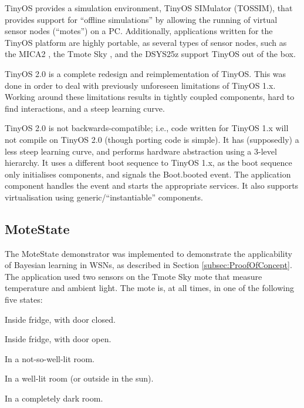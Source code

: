 \documentclass{sig-alternate-10pt}
\begin{document}
TinyOS provides a simulation environment, TinyOS SIMulator (TOSSIM), that provides support for ``offline simulations'' by allowing the running of virtual sensor nodes (``motes'') on a PC. Additionally, applications written for the TinyOS platform are highly portable, as several types of sensor nodes, such as the MICA2 \cite{Mica2DataSheet:2007}, the Tmote Sky \cite{TmoteskyDataSheet:2007}, and the DSYS25z \cite{DSYS25zFlynn:2005} support TinyOS out of the box.

TinyOS 2.0 \cite{TinyOSManual:2006,TinyOS:2006} is a complete redesign and reimplementation of
TinyOS. This was done in order to deal with previously unforeseen
limitations of TinyOS 1.x. Working around these limitations results in tightly
coupled components, hard to find interactions, and a steep learning curve. 

TinyOS 2.0 is not backwards-compatible; i.e., code written for TinyOS 1.x will
not compile on TinyOS 2.0 (though porting code is simple). It has (supposedly) a
less steep learning curve, and performs hardware abstraction using a 3-level
hierarchy. It uses a different boot sequence to TinyOS 1.x, as the boot sequence
only initialises components, and signals the Boot.booted event. The application
component handles the event and starts the appropriate services. It also
supports virtualisation using generic/``instantiable'' components.

\subsection{MoteState} \label{subsec:MoteState}

The MoteState demonstrator was implemented to demonstrate the
applicability of Bayesian learning in WSNs, as described in Section \ref{subsec:ProofOfConcept}.
The application used two
sensors on the Tmote Sky \cite{TmoteskyDataSheet:2007} mote that measure 
temperature and
ambient light. The mote is, at all times, in one of the following five states:

\begin{compactitem}
  \item Inside fridge, with door closed.
  \item Inside fridge, with door open.
  \item In a not-so-well-lit room.
  \item In a well-lit room (or outside in the sun).
  \item In a completely dark room.
\end{compactitem}
\end{document}
